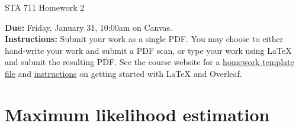 \documentclass[11pt]{article}
\begin{document}
\begin{center}
\Large
STA 711 Homework 2\\
\normalsize
\vspace{5mm}
\end{center}

\noindent \textbf{Due:} Friday, January 31, 10:00am on Canvas.\\ 

\noindent \textbf{Instructions:} Submit your work as a single PDF. You may choose to either hand-write your work and submit a PDF scan, or type your work using LaTeX and submit the resulting PDF. See the course website for a \href{https://sta711-s25.github.io/homework/hw_template.tex}{homework template file} and \href{https://sta711-s25.github.io/homework/latex_instructions/}{instructions} on getting started with LaTeX and Overleaf.

\section*{Maximum likelihood estimation}
\end{document}
